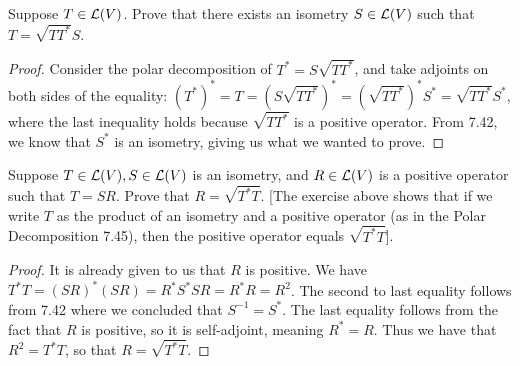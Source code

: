 \begin{exercise}{3}
  Suppose $T\in\mathcal{L}(V)$. Prove that there exists an isometry $S\in\mathcal{L}(V)$ such that $T =\sqrt{TT^\ast}S$.
\end{exercise}
\begin{proof}
 Consider the polar decomposition of $T^\ast=S\sqrt{TT^\ast}$, and take adjoints on both sides of the equality: $(T^\ast)^\ast = T =(S\sqrt{TT^\ast})^\ast =(\sqrt{TT^\ast})^\ast S^\ast =\sqrt{TT^\ast}S^\ast$, where the last inequality holds because $\sqrt{TT^\ast}$ is a positive operator. From 7.42, we know that $S^\ast$ is an isometry, giving us what we wanted to prove.
\end{proof}

\begin{exercise}{8}
  Suppose $T\in\mathcal{L}(V),S\in\mathcal{L}(V)$ is an isometry, and $R\in\mathcal{L}(V)$ is a positive operator such that $T=SR$. Prove that $R =\sqrt{T^\ast T}$. [The exercise above shows that if we write $T$ as the product of an isometry and a positive operator (as in the Polar Decomposition 7.45), then the positive operator equals $\sqrt{T^\ast T}$].
\end{exercise}
\begin{proof}
 It is already given to us that $R$ is positive. We have $T^\ast T =(SR)^\ast (SR) =R^\ast S^\ast S R =R^\ast R =R^2$. The second to last equality follows from 7.42 where we concluded that $S^{-1} =S^\ast$. The last equality follows from the fact that $R$ is positive, so it is self-adjoint, meaning $R^\ast = R$. Thus we have that $R^2 =T^\ast T$, so that $R =\sqrt{T^\ast T}$.
\end{proof}

